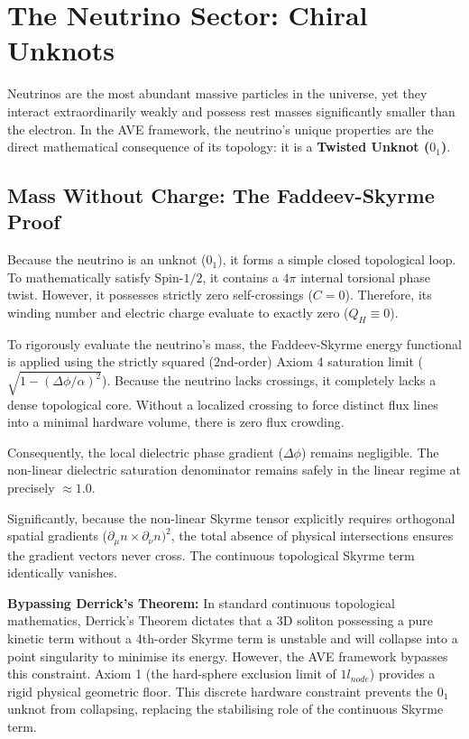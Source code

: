 \chapter{The Neutrino Sector: Chiral Unknots}
\label{ch:neutrino_sector}

Neutrinos are the most abundant massive particles in the universe, yet they interact extraordinarily weakly and possess rest masses significantly smaller than the electron. In the AVE framework, the neutrino's unique properties are the direct mathematical consequence of its topology: it is a \textbf{Twisted Unknot ($0_1$)}.

\section{Mass Without Charge: The Faddeev-Skyrme Proof}

Because the neutrino is an unknot ($0_{1}$), it forms a simple closed topological loop. To
mathematically satisfy Spin-$1/2$, it contains a $4\pi$ internal torsional phase twist. However, it
possesses strictly zero self-crossings ($C=0$). Therefore, its winding number and electric
charge evaluate to exactly zero ($Q_{H}\equiv0$).

To rigorously evaluate the neutrino's mass, the Faddeev-Skyrme energy functional is
applied using the strictly squared (2nd-order) Axiom 4 saturation limit ($\sqrt{1-(\Delta\phi/\alpha)^{2}}$). Because the
neutrino lacks crossings, it completely lacks a dense topological core. Without a localized
crossing to force distinct flux lines into a minimal hardware volume, there is zero flux crowding.

Consequently, the local dielectric phase gradient ($\Delta\phi$) remains negligible. The non-linear
dielectric saturation denominator remains safely in the linear regime at precisely $\approx1.0$.

Significantly, because the non-linear Skyrme tensor explicitly requires orthogonal spatial
gradients ($\partial_{\mu}n\times\partial_{\nu}n)^{2}$, the total absence of physical intersections ensures the gradient vectors never cross. The continuous topological Skyrme term identically vanishes. 

\textbf{Bypassing Derrick's Theorem:} In standard continuous topological mathematics, Derrick's Theorem dictates that a 3D soliton possessing a pure kinetic term without a 4th-order Skyrme term is unstable and will collapse into a point singularity to minimise its energy. However, the AVE framework bypasses this constraint. Axiom 1 (the hard-sphere exclusion limit of $1 l_{node}$) provides a rigid physical geometric floor. This discrete hardware constraint prevents the $0_1$ unknot from collapsing, replacing the stabilising role of the continuous Skyrme term.

